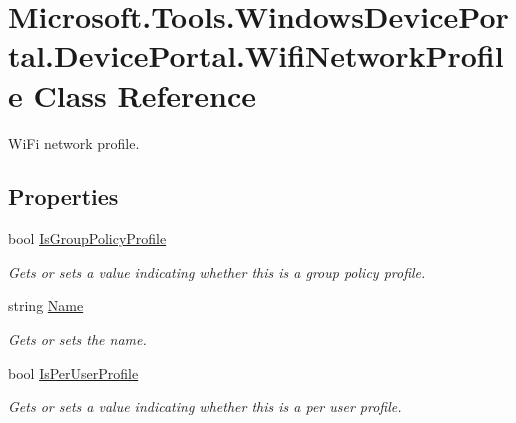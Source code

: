\hypertarget{class_microsoft_1_1_tools_1_1_windows_device_portal_1_1_device_portal_1_1_wifi_network_profile}{}\section{Microsoft.\+Tools.\+Windows\+Device\+Portal.\+Device\+Portal.\+Wifi\+Network\+Profile Class Reference}
\label{class_microsoft_1_1_tools_1_1_windows_device_portal_1_1_device_portal_1_1_wifi_network_profile}


Wi\+Fi network profile.  


\subsection*{Properties}
\begin{DoxyCompactItemize}
\item 
bool \hyperlink{class_microsoft_1_1_tools_1_1_windows_device_portal_1_1_device_portal_1_1_wifi_network_profile_a467bdb43788732cf7f2faf6a62503124}{Is\+Group\+Policy\+Profile}
\begin{DoxyCompactList}\small\item\em Gets or sets a value indicating whether this is a group policy profile. \end{DoxyCompactList}\item 
string \hyperlink{class_microsoft_1_1_tools_1_1_windows_device_portal_1_1_device_portal_1_1_wifi_network_profile_a06125b7b5588eb9ccda99ae59320f7a9}{Name}
\begin{DoxyCompactList}\small\item\em Gets or sets the name. \end{DoxyCompactList}\item 
bool \hyperlink{class_microsoft_1_1_tools_1_1_windows_device_portal_1_1_device_portal_1_1_wifi_network_profile_a1288296065a49ac0270a2689dcf9311f}{Is\+Per\+User\+Profile}
\begin{DoxyCompactList}\small\item\em Gets or sets a value indicating whether this is a per user profile. \end{DoxyCompactList}\end{DoxyCompactItemize}


